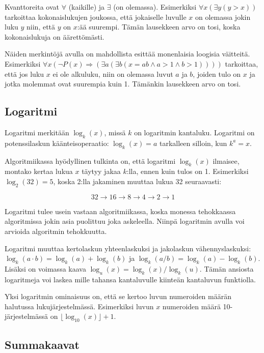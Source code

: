 Kvanttoreita ovat $\forall$ (kaikille) ja $\exists$
(on olemassa).
Esimerkiksi $\forall x (\exists y (y > x))$
tarkoittaa kokonaislukujen joukossa,
että jokaiselle luvulle $x$ on olemassa
jokin luku $y$ niin, että $y$ on $x$:ää suurempi.
Tämän lausekkeen arvo on tosi, koska kokonaislukuja
on äärettömästi.

Näiden merkintöjä avulla on mahdollista esittää
monenlaisia loogisia väitteitä.
Esimerkiksi
$\forall x (\lnot P(x) \Rightarrow (\exists a (\exists b (x = ab \land a > 1 \land b > 1))))$
tarkoittaa, että jos luku $x$ ei ole alkuluku,
niin on olemassa luvut $a$ ja $b$,
joiden tulo on $x$ ja jotka molemmat ovat suurempia kuin 1.
Tämänkin lausekkeen arvo on tosi.

\subsection{Logaritmi}

Logaritmi merkitään $\log_k(x)$, missä $k$ on logaritmin kantaluku.
Logaritmi on potenssilaskun käänteisoperaatio:
$\log_k(x)=a$ tarkalleen silloin, kun $k^a=x$.

Algoritmiikassa hyödyllinen tulkinta on,
että logaritmi $\log_k(x)$ ilmaisee, montako kertaa lukua $x$
täytyy jakaa $k$:lla, ennen kuin tulos on 1.
Esimerkiksi $\log_2(32)=5$, koska 2:lla jakaminen
muuttaa lukua 32 seuraavasti:

\[32 \rightarrow 16 \rightarrow 8 \rightarrow 4 \rightarrow 2 \rightarrow 1 \]

Logaritmi tulee usein vastaan algoritmiikassa,
koska monessa tehokkaassa algoritmissa jokin asia puolittuu
joka askeleella.
Niinpä logaritmin avulla voi arvioida algoritmin tehokkuutta.

Logaritmi muuttaa kertolaskun yhteenlaskuksi ja
jakolaskun vähennyslaskuksi:
$\log_k(a \cdot b) = \log_k(a)+\log_k(b)$ ja
$\log_k(a / b) = \log_k(a)-\log_k(b)$.
Lisäksi on voimassa kaava $\log_u(x) = \log_k(x)/\log_k(u)$.
Tämän ansiosta logaritmeja voi laskea mille tahansa kantaluvulle
kiinteän kantaluvun funktiolla.

Yksi logaritmin ominaisuus on, että se kertoo luvun numeroiden
määrän halutussa lukujärjestelmässä.
Esimerkiksi luvun $x$ numeroiden määrä 10-jär\-jes\-tel\-mäs\-sä on
$\lfloor \log_{10}(x)\rfloor + 1$.

\subsection{Summakaavat}

